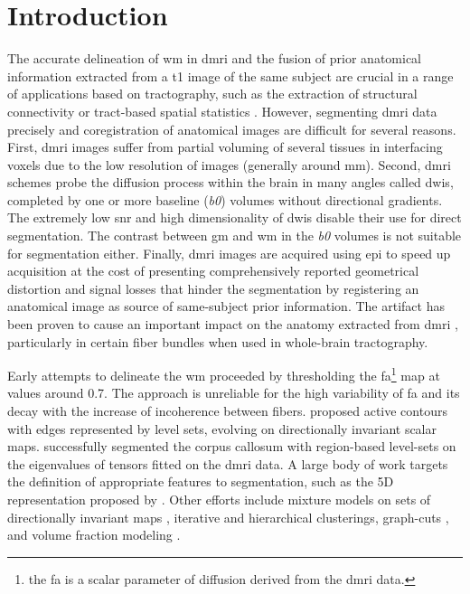 \section{Introduction}\label{sec:introduction}
The accurate delineation of \gls*{wm} in \gls*{dmri} and the fusion of prior
  anatomical information extracted from a \gls*{t1} image of the same subject
  are crucial in a range of applications based on tractography, such as
  the extraction of structural connectivity \citep{craddock_imaging_2013} or
  tract-based spatial statistics \citep{smith_tractbased_2006}.
However, segmenting \gls*{dmri} data precisely and coregistration of anatomical
  images are difficult for several reasons.
First, \gls{dmri} images suffer from partial voluming of several tissues in 
  interfacing voxels due to the low resolution of images (generally around
  mm).
Second, \gls*{dmri} schemes probe the diffusion process within the brain in 
  many angles called \glspl*{dwi}, completed by one or more baseline (\emph{b0}) 
  volumes without directional gradients.
The extremely low \gls*{snr} and high dimensionality of \glspl*{dwi} disable their
  use for direct segmentation.
The contrast between \gls*{gm} and \gls*{wm} in the \emph{b0} volumes is not suitable for 
  segmentation either.
Finally, \gls*{dmri} images are acquired using \gls*{epi} to speed up acquisition
  at the cost of presenting comprehensively reported geometrical distortion and 
  signal losses \citep{jezzard_correction_1995} that hinder the segmentation by
  registering an anatomical image as source of same-subject prior information.
The artifact has been proven to cause an important impact on the anatomy extracted
  from \gls*{dmri} \citep{irfanoglu_effects_2012}, particularly in certain fiber bundles
  when used in whole-brain tractography.

Early attempts to delineate the \gls*{wm} proceeded by thresholding the 
  \gls*{fa}\footnote{the \gls*{fa} is a scalar parameter of diffusion derived from
  the \gls*{dmri} data.} map at values around 0.7.
The approach is unreliable for the high variability of \gls*{fa} and its
  decay with the increase of incoherence between fibers.
\cite{zhukov_level_2003} proposed active contours with edges represented
  by level sets, evolving on directionally invariant scalar maps.
\cite{rousson_level_2004} successfully segmented the corpus callosum with
  region-based level-sets on the eigenvalues of tensors fitted on the
  \gls*{dmri} data.
A large body of work targets the definition of appropriate features to segmentation,
  such as the 5D representation proposed by \cite{jonasson_segmentation_2005}.
Other efforts include mixture models on sets of directionally invariant maps
  \citep{liu_brain_2007}, iterative \citep{hadjiprocopis_unbiased_2005} and
  hierarchical \citep{lu_segmentation_2008} clusterings,
  graph-cuts \citep{han_experimental_2009}, and volume fraction modeling
  \citep{kumazawa_improvement_2013}.

